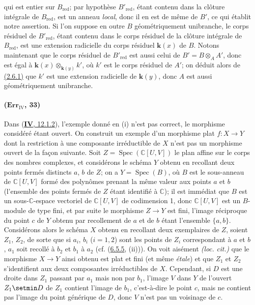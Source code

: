 qui est entier sur $B_{\mathrm{red}}$; par hypothèse
$B'_{\mathrm{red}}$, étant contenu dans la clôture intégrale de
$B_{\mathrm{red}}$, est un anneau \emph{local}, donc il en est de même de
$B'$, ce qui établit notre assertion.
Si l'on suppose en outre $B$ géométriquement unibranche, le corps
résiduel de $B'_{\mathrm{red}}$, étant contenu dans le corps résiduel de
la clôture intégrale de $B_{\mathrm{red}}$, est une extension radicielle
du corps résiduel $\boldsymbol{k}(x)$ de $B$. Notons maintenant que le corps résiduel
de $B'_{\mathrm{red}}$ est aussi celui de $B'=B\otimes_AA'$, donc est
égal à $\boldsymbol{k}(x)\otimes_{\mathbf{k}(y)}k'$, où $k'$ est le corps résiduel de $A'$;
on déduit alors de {\hyperref[canon-index.ega4.c04.prop.2-6-1]{(2.6.1)}} que $k'$
est une extension radicielle de $\boldsymbol{k}(y)$, donc $A$ est aussi
géométriquement unibranche.

\paragraph{($\mathbf{Err}_{\mathrm{IV}}$, 33)}
Dans ({\hyperref[canon-index.ega4.c04.item.12-1-2]{\textbf{IV}, 12.1.2}}), l'exemple donné
en (i) n'est pas correct, le morphisme considéré étant ouvert. On
construit un exemple d'un morphisme plat $f:X\to Y$ dont la restriction
à une composante irréductible de $X$ n'est pas un morphisme ouvert de
la façon suivante. Soit $Z=\operatorname{Spec}(\mathbb C[U,V])$ le
plan affine sur le corps des nombres complexes, et considérons le
schéma $Y$ obtenu en recollant deux points fermés distincts $a$, $b$ de
$Z$; on a $Y=\operatorname{Spec}(B)$, où $B$ est le sous-anneau de
$\mathbb C[U,V]$ formé des polynômes prenant la même valeur aux points
$a$ et $b$ (l'ensemble des points fermés de $Z$ étant identifié à
$\mathbb C$); il est immédiat que $B$ est un sous-$\mathbb C$-espace
vectoriel de $\mathbb C[U,V]$ de codimension 1, donc $\mathbb C[U,V]$
est un $B$-module de type fini, et par suite le morphisme $Z\to Y$ est
fini, l'image réciproque du point $c$ de $Y$ obtenu par recollement de
$a$ et de $b$ étant l'ensemble $\{a,b\}$.
Considérons alors le schéma $X$ obtenu en recollant deux exemplaires de
$Z$, soient $Z_1$, $Z_2$, de sorte que si $a_i$, $b_i$ ($i=1,2$) sont
les points de $Z_i$ correspondant à $a$ et $b$, $a_1$ soit recollé à
$b_2$ et $b_1$ à $a_2$ (cf. ({\hyperref[canon-index.ega4.c04.item.6-5-5]{6.5.5}},
(ii))). On voit aisément \emph{(loc. cit.)} que le morphisme $X\to Y$
ainsi obtenu est plat et fini (et même \emph{étale}) et que $Z_1$ et $Z_2$
s'identifient aux deux composantes irréductibles de $X$. Cependant, si
$D$ est une droite dans $Z_1$ passant par $a_1$ mais non par $b_1$,
l'image $V$ dans $Y$ de l'ouvert $Z_1\setmin D$ de $Z_1$ contient l'image de
$b_1$, c'est-à-dire le point $c$, mais ne contient pas l'image du point
générique de $D$, donc $V$ n'est pas un voisinage de $c$.

